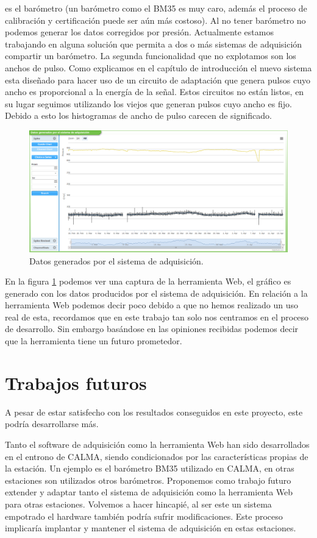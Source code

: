 	es el barómetro (un barómetro como el BM35 es muy caro, además el proceso de calibración y certificación puede ser aún más costoso). Al no
	tener barómetro no podemos generar los datos corregidos por presión. Actualmente estamos trabajando en alguna solución que permita a dos o más
	sistemas de adquisición compartir un barómetro. La segunda funcionalidad que no explotamos son los anchos de pulso. Como explicamos en el
	capítulo de introducción el nuevo sistema esta diseñado para hacer uso de un circuito de adaptación que genera pulsos cuyo ancho es
	proporcional a la energía de la señal. Estos circuitos no están listos, en su lugar seguimos utilizando los viejos que generan pulsos cuyo
	ancho es fijo. Debido a esto los histogramas de ancho de pulso carecen de significado. 
	\begin{figure}[h]
		\centering
		\includegraphics[keepaspectratio, width=1\textwidth]{./img/resultados.png}
		\caption{Datos generados por el sistema de adquisición.}   
		\label{fig:resultados}
	\end{figure}
	\par
	En la figura \ref{fig:resultados} podemos ver una captura de la herramienta Web, el gráfico es generado con los datos producidos por el
	sistema de adquisición. En relación a la herramienta Web podemos decir poco debido a que no hemos realizado un uso real de esta, recordamos
	que en este trabajo tan solo nos centramos en el proceso de desarrollo. Sin embargo basándose en las opiniones recibidas podemos decir que la
	herramienta tiene un futuro prometedor.

\section{Trabajos futuros}
	A pesar de estar satisfecho con los resultados conseguidos en este proyecto, este podría desarrollarse más.
	\par
	Tanto el software de adquisición como la herramienta Web han sido desarrollados en el entrono de CALMA, siendo condicionados por las
	características propias de la estación. Un ejemplo es el barómetro BM35 utilizado en CALMA, en otras estaciones son utilizados otros
	barómetros. Proponemos como trabajo futuro extender y adaptar tanto el sistema de adquisición como la herramienta Web para otras estaciones.
	Volvemos a hacer hincapié, al ser este un sistema empotrado el hardware también podría sufrir modificaciones. Este proceso implicaría
	implantar y mantener el sistema de adquisición en estas estaciones.
